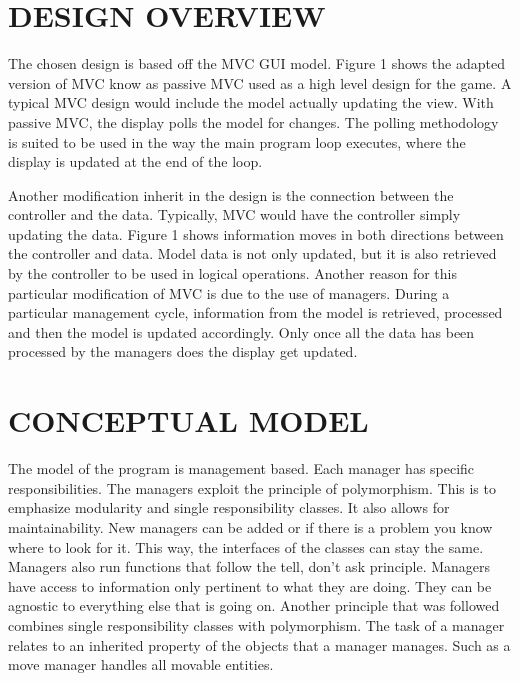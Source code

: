 \documentclass[10pt,twocolumn]{witseiepaper}
\begin{document}
%
\section{DESIGN OVERVIEW} %
The chosen design is based off the MVC GUI model. Figure 1 shows the adapted version of MVC know as passive MVC used as a high level design for the game. A typical MVC design would include the model actually updating the view. With passive MVC, the display polls the model for changes. The polling methodology is suited to be used in the way the main program loop executes, where the display is updated at the end of the loop. 

Another modification inherit in the design is the connection between the controller and the data. Typically, MVC would have the controller simply updating the data. Figure 1 shows information moves in both directions between the controller and data. Model data is not only updated, but it is also retrieved by the controller to be used in logical operations. Another reason for this particular modification of MVC is due to the use of managers. During a particular management cycle, information from the model is retrieved, processed and then the model is updated accordingly. Only once all the data has been processed by the managers does the display get updated.  


%
\section{CONCEPTUAL MODEL} %
The model of the program is management based. Each manager has specific responsibilities. The managers exploit the principle of polymorphism. This is to emphasize modularity and single responsibility classes. It also allows for maintainability. New managers can be added or if there is a problem you know where to look for it. This way, the interfaces of the classes can stay the same. Managers also run functions that follow the tell, don't ask principle. Managers have access to information only pertinent to what they are doing. They can be agnostic to everything else that is going on. Another principle that was followed combines single responsibility classes with polymorphism. The task of a manager relates to an inherited property of the objects that a manager manages. Such as a move manager handles all movable entities.
\end{document}
